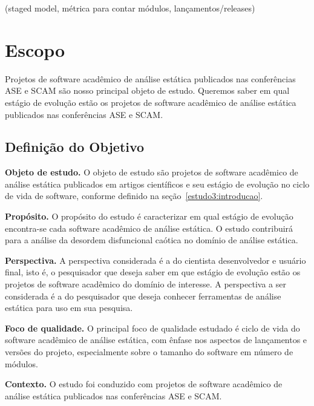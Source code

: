 (staged model, métrica para contar módulos, lançamentos/releases)

\section{Escopo} \label{estudo3:escopo} %

Projetos de software acadêmico de análise estática publicados nas 
conferências ASE e SCAM 
são nosso principal objeto de estudo.
Queremos saber em qual estágio de evolução estão os projetos de software
acadêmico de análise estática publicados nas conferências ASE e SCAM.

\subsection{Definição do Objetivo}

\begin{description}

  \item{\bf Objeto de estudo.}
    O objeto de estudo são projetos de software acadêmico de análise estática
    publicados em artigos científicos e seu estágio de evolução no ciclo de
    vida de software, conforme definido na seção~\ref{estudo3:introducao}.

  \item{\bf Propósito.}
    O propósito do estudo é caracterizar em qual estágio de evolução
    encontra-se cada software acadêmico de análise estática. O estudo
    contribuirá para a análise da desordem disfuncional caótica no domínio de
    análise estática. 

  \item{\bf Perspectiva.}
    A perspectiva considerada é a do cientista desenvolvedor e usuário final, isto é, o pesquisador
    que deseja saber em que estágio de evolução estão os projetos de software acadêmico do domínio
    de interesse. A perspectiva a ser considerada é a do pesquisador que deseja
    conhecer ferramentas de análise estática para uso em sua pesquisa.

  \item{\bf Foco de qualidade.}
    O principal foco de qualidade estudado é ciclo de vida do software
    acadêmico de análise estática, com ênfase nos aspectos de lançamentos e
    versões do projeto, especialmente sobre o tamanho do software em número de
    módulos.

  \item{\bf Contexto.}
    O estudo foi conduzido com projetos de software acadêmico de análise
    estática publicados nas conferências ASE e SCAM.

\end{description}

